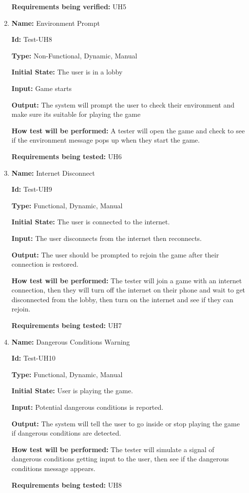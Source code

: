\documentclass[12pt, titlepage]{article}
\begin{document}
\begin{enumerate}
\textbf{Requirements being verified:} UH5

\item{\textbf{Name:} Environment Prompt }

\textbf{Id:} Test-UH8

\textbf{Type:} Non-Functional, Dynamic, Manual
					
\textbf{Initial State:} The user is in a lobby
					
\textbf{Input:} Game starts
					
\textbf{Output:} The system will prompt the user to check their environment and make sure its suitable for playing the game
					
\textbf{How test will be performed:} A tester will open the game and check to see if the environment message pops up when they start the game. 

\textbf{Requirements being tested:} UH6

\item{\textbf{Name: }Internet Disconnect }

\textbf{Id:} Test-UH9

\textbf{Type:} Functional, Dynamic, Manual
					
\textbf{Initial State:} The user is connected to the internet.
					
\textbf{Input:} The user disconnects from the internet then reconnects.
					
\textbf{Output:} The user should be prompted to rejoin the game after their connection is restored.
					
\textbf{How test will be performed:} The tester will join a game with an internet connection, then they will turn off the internet on their phone and wait to get disconnected from the lobby, then turn on the internet and see if they can rejoin.

\textbf{Requirements being tested:} UH7

\item{\textbf{Name: }Dangerous Conditions Warning }

\textbf{Id:} Test-UH10

\textbf{Type:} Functional, Dynamic, Manual
					
\textbf{Initial State:} User is playing the game.
					
\textbf{Input:} Potential dangerous conditions is reported.
					
\textbf{Output:} The system will tell the user to go inside or stop playing the game if dangerous conditions are detected.
					
\textbf{How test will be performed:} The tester will simulate a signal of dangerous conditions getting input to the user, then see if the dangerous conditions message appears.

\textbf{Requirements being tested:} UH8

\end{enumerate}
\end{document}
